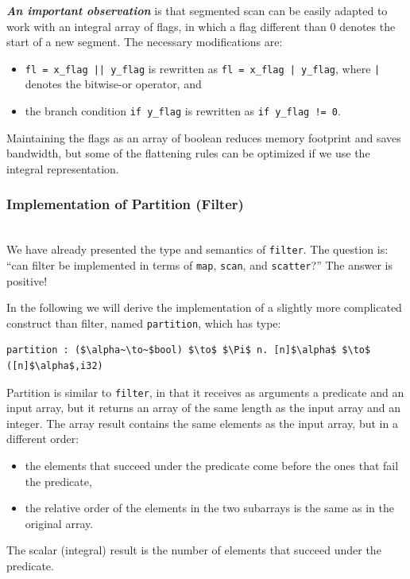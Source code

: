 \documentclass[acmsmall,review]{acmart}\settopmatter{printfolios=true,printccs=false,printacmref=false}
\begin{document}
\textbf{\em An important observation} is that segmented scan can be easily 
adapted to work with an integral array of flags, in which a flag different 
than $0$ denotes the start of a new segment. The necessary modifications are:
\begin{itemize}
    \item {\tt fl = x\_flag || y\_flag} is rewritten as {\tt fl = x\_flag | y\_flag},
            where {\tt |} denotes the bitwise-or operator, and
    \item the branch condition {\tt if y\_flag} is rewritten as
            {\tt if y\_flag != 0}.
\end{itemize}
Maintaining the flags as an array of boolean reduces memory footprint and
saves bandwidth, but some of the flattening rules can be optimized if we
use the integral representation.

\subsubsection{Implementation of Partition (Filter)}
\label{subsubsub:filter-impl}
$\mbox{ }$\\

We have already presented the type and semantics of \lstinline{filter}.
The question is: ``can filter be implemented in terms of \lstinline{map},
\lstinline{scan}, and \lstinline{scatter}?''
The answer is positive! 

In the following we will derive the implementation of a slightly more complicated 
construct than filter, named \lstinline{partition}, which has type:
\begin{lstlisting}[mathescape=true]
partition : ($\alpha~\to~$bool) $\to$ $\Pi$ n. [n]$\alpha$ $\to$ ([n]$\alpha$,i32) 
\end{lstlisting}\vspace{-2ex}
Partition is similar to \lstinline{filter}, in that it receives
as arguments a predicate and an input array, but it returns
an array of the same length as the input array and an integer.
The array result contains the same elements as the input array,
but in a different order: 
\begin{itemize}
    \item the elements that succeed under the predicate
            come before the ones that fail the predicate,
    \item the relative order of the elements in the two
            subarrays is the same as in the original array.
\end{itemize}
The scalar (integral) result is the number of elements that succeed 
under the predicate. 
\end{document}

